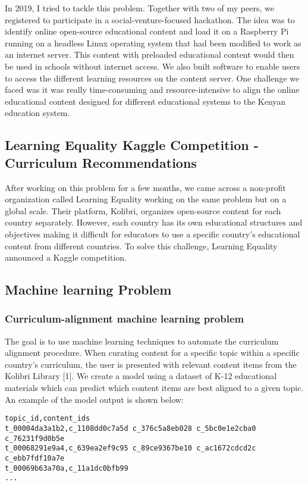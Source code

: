 \documentclass{article}
\begin{document}
In 2019, I tried to tackle this problem. Together with two of my peers, we registered to participate in a social-venture-focused hackathon. The idea was to identify online open-source educational content and load it on a Raspberry Pi running on a headless Linux operating system that had been modified to work as an internet server. This content with preloaded educational content would then be used in schools without internet access. We also built software to enable users to access the different learning resources on  the content server. One challenge we faced was it was really time-consuming and resource-intensive to align the online educational content designed for different educational systems to the Kenyan education system. 

\subsection{Learning Equality Kaggle Competition - Curriculum Recommendations}
After working on this problem for a few months, we came across a non-profit organization called Learning Equality working on the same problem but on a global scale. Their platform, Kolibri, organizes open-source content for each country separately. However, each country has its own educational structures and objectives making it difficult for educators to use a specific country's educational content from different countries. To solve this challenge, Learning Equality announced a Kaggle competition. 

\subsection{Machine learning Problem}

\subsubsection{Curriculum-alignment machine learning problem}
The goal is to use machine learning techniques to automate the curriculum alignment procedure. When curating content for a specific topic within a specific country's curriculum, the user is presented with relevant content items from the Kolibri Library [1]. We create a model using a dataset of K-12 educational materials which can predict which content items are best aligned to a given topic. An example of the model output is shown below:

\begin{lstlisting}
topic_id,content_ids
t_00004da3a1b2,c_1108dd0c7a5d c_376c5a8eb028 c_5bc0e1e2cba0 c_76231f9d0b5e
t_00068291e9a4,c_639ea2ef9c95 c_89ce9367be10 c_ac1672cdcd2c c_ebb7fdf10a7e
t_00069b63a70a,c_11a1dc0bfb99
...
\end{lstlisting}
\end{document}
